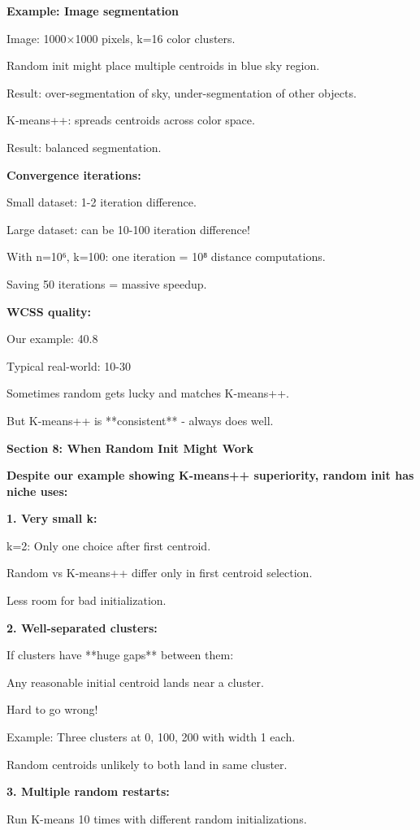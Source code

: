 \documentclass[12pt]{article}
\begin{document}
\begin{explanation}
\textbf{Example: Image segmentation}

Image: 1000×1000 pixels, k=16 color clusters.

Random init might place multiple centroids in blue sky region.

Result: over-segmentation of sky, under-segmentation of other objects.

K-means++: spreads centroids across color space.

Result: balanced segmentation.

\textbf{Convergence iterations:}

Small dataset: 1-2 iteration difference.

Large dataset: can be 10-100 iteration difference!

With n=10⁶, k=100: one iteration = 10⁸ distance computations.

Saving 50 iterations = massive speedup.

\textbf{WCSS quality:}

Our example: 40.8%

Typical real-world: 10-30%

Sometimes random gets lucky and matches K-means++.

But K-means++ is **consistent** - always does well.

\textbf{Section 8: When Random Init Might Work}

\textbf{Despite our example showing K-means++ superiority, random init has niche uses:}

\textbf{1. Very small k:}

k=2: Only one choice after first centroid.

Random vs K-means++ differ only in first centroid selection.

Less room for bad initialization.

\textbf{2. Well-separated clusters:}

If clusters have **huge gaps** between them:

Any reasonable initial centroid lands near a cluster.

Hard to go wrong!

Example: Three clusters at 0, 100, 200 with width 1 each.

Random centroids unlikely to both land in same cluster.

\textbf{3. Multiple random restarts:}

Run K-means 10 times with different random initializations.


\end{explanation}
\end{document}

